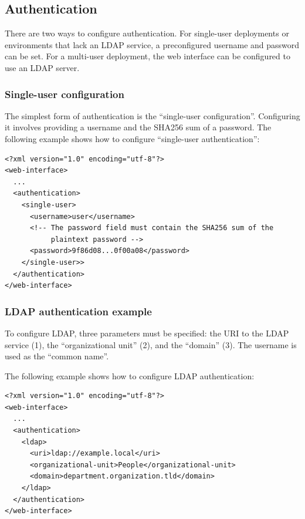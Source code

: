 \subsection{Authentication}
\label{sec:authentication}

  There are two ways to configure authentication.  For single-user deployments
  or environments that lack an LDAP service, a preconfigured username and
  password can be set.  For a multi-user deployment, the web interface can be
  configured to use an LDAP server.

\subsubsection{Single-user configuration}

  The simplest form of authentication is the ``single-user configuration''.
  Configuring it involves providing a username and the SHA256 sum of a password.
  The following example shows how to configure ``single-user authentication'':

\begin{siderules}
\begin{verbatim}
<?xml version="1.0" encoding="utf-8"?>
<web-interface>
  ...
  <authentication>
    <single-user>
      <username>user</username>
      <!-- The password field must contain the SHA256 sum of the
           plaintext password -->
      <password>9f86d08...0f00a08</password>
    </single-user>>
  </authentication>
</web-interface>
\end{verbatim}
\end{siderules}

\subsubsection{LDAP authentication example}

  To configure LDAP, three parameters must be specified: the URI to the LDAP
  service (1), the ``organizational unit'' (2), and the ``domain'' (3).  The
  username is used as the ``common name''.

  The following example shows how to configure LDAP authentication:

\begin{siderules}
\begin{verbatim}
<?xml version="1.0" encoding="utf-8"?>
<web-interface>
  ...
  <authentication>
    <ldap>
      <uri>ldap://example.local</uri>
      <organizational-unit>People</organizational-unit>
      <domain>department.organization.tld</domain>
    </ldap>
  </authentication>
</web-interface>
\end{verbatim}
\end{siderules}

